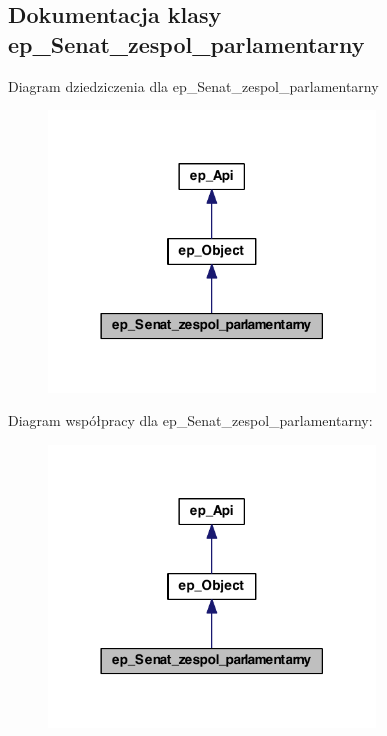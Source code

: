 \hypertarget{classep___senat__zespol__parlamentarny}{\subsection{Dokumentacja klasy ep\-\_\-\-Senat\-\_\-zespol\-\_\-parlamentarny}
\label{classep___senat__zespol__parlamentarny}
}


Diagram dziedziczenia dla ep\-\_\-\-Senat\-\_\-zespol\-\_\-parlamentarny\nopagebreak
\begin{figure}[H]
\begin{center}
\leavevmode
\includegraphics[width=246pt]{classep___senat__zespol__parlamentarny__inherit__graph}
\end{center}
\end{figure}


Diagram współpracy dla ep\-\_\-\-Senat\-\_\-zespol\-\_\-parlamentarny\-:\nopagebreak
\begin{figure}[H]
\begin{center}
\leavevmode
\includegraphics[width=246pt]{classep___senat__zespol__parlamentarny__coll__graph}
\end{center}
\end{figure}
